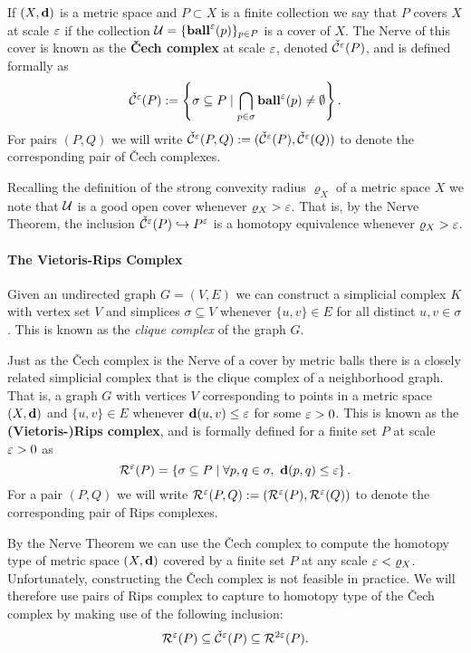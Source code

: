 If $(X,\mathbf{d})$ is a metric space and $P\subset X$ is a finite collection we say that $P$ covers $X$ at scale $\varepsilon$ if the collection $\mathcal{U} = \{\mathbf{ball}^\varepsilon(p)\}_{p\in P}$ is a cover of $X$.
The Nerve of this cover is known as the \textbf{\v Cech complex} at scale $\varepsilon$, denoted $\check{\mathcal{C}}^\varepsilon(P)$, and is defined formally as
\[ \check{\mathcal{C}}^\varepsilon(P) := \left\{\sigma \subseteq P\mid \bigcap_{p\in \sigma}\mathbf{ball}^\varepsilon(p)\neq \emptyset \right\}. \]
For pairs $(P, Q)$ we will write $\check{\mathcal{C}}^\varepsilon(P,Q) := (\check{\mathcal{C}}^\varepsilon(P), \check{\mathcal{C}}^\varepsilon(Q))$ to denote the corresponding pair of \v Cech complexes.

Recalling the definition of the strong convexity radius $\varrho_X$ of a metric space $X$ we note that $\mathcal{U}$ is a good open cover whenever $\varrho_X > \varepsilon$.
That is, by the Nerve Theorem, the inclusion $\check{\mathcal{C}}^\varepsilon(P)\hookrightarrow P^\varepsilon$ is a homotopy equivalence whenever $\varrho_X > \varepsilon$.

\paragraph{The Vietoris-Rips Complex}

Given an undirected graph $G = (V, E)$ we can construct a simplicial complex $K$ with vertex set $V$ and simplices $\sigma\subseteq V$ whenever $\{u,v\}\in E$ for all distinct $u, v\in\sigma$.
This is known as the \emph{clique complex} of the graph $G$.

Just as the \v Cech complex is the Nerve of a cover by metric balls there is a closely related simplicial complex that is the clique complex of a neighborhood graph.
That is, a graph $G$ with vertices $V$ corresponding to points in a metric space $(X,\mathbf{d})$ and $\{u,v\}\in E$ whenever $\mathbf{d}(u,v)\leq \varepsilon$ for some $\varepsilon > 0$.
This is known as the \textbf{(Vietoris-)Rips complex}, and is formally defined for a finite set $P$ at scale $\varepsilon > 0$ as
\[ \mathcal{R}^\varepsilon(P) = \left\{\sigma \subseteq P\mid \forall p,q\in\sigma,\ \mathbf{d}(p, q)\leq \varepsilon\right\}. \]
For a pair $(P, Q)$ we will write $\mathcal{R}^\varepsilon(P,Q) := (\mathcal{R}^\varepsilon(P), \mathcal{R}^\varepsilon(Q))$ to denote the corresponding pair of Rips complexes.

By the Nerve Theorem we can use the \v Cech complex to compute the homotopy type of metric space $(X, \mathbf{d})$ covered by a finite set $P$ at any scale $\varepsilon < \varrho_X$.
Unfortunately, constructing the \v Cech complex is not feasible in practice.
We will therefore use pairs of Rips complex to capture to homotopy type of the \v Cech complex by making use of the following inclusion:
\[ \mathcal{R}^\varepsilon(P) \subseteq \check{\mathcal{C}}^\varepsilon(P)\subseteq \mathcal{R}^{2\varepsilon}(P).\]
